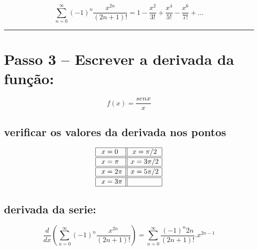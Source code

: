 \documentclass[11pt]{article}
\begin{document}
\begin{equation*}
\sum_{n=0}^\infty (-1)^n \frac{x^{2n}}{(2n+1)!} = 1 - \frac{x^2}{3!} + \frac{x^4}{5!} -\frac{x^6}{7!} + ...
\end{equation*}

    \begin{center}\rule{0.5\linewidth}{\linethickness}\end{center}

    \hypertarget{passo-3-escrever-a-derivada-da-funuxe7uxe3o}{%
\section{Passo 3 -- Escrever a derivada da
função:}\label{passo-3-escrever-a-derivada-da-funuxe7uxe3o}}

\begin{equation*}
f(x)   = \frac{senx}{x}
\end{equation*}

\hypertarget{verificar-os-valores-da-derivada-nos-pontos}{%
\subsection{verificar os valores da derivada nos
pontos}\label{verificar-os-valores-da-derivada-nos-pontos}}

\[\begin{array}{|l||c|}
\hline \
x = 0 & x = \pi/2\\
\hline
\hline \
x = \pi & x =3\pi/2\\
\hline
\hline \
x = 2\pi & x =5\pi/2\\
\hline
\hline \
x = 3\pi & \\
\hline
\end{array}\]

    \hypertarget{derivada-da-serie}{%
\subsection{derivada da serie:}\label{derivada-da-serie}}

\begin{equation*}
\frac{d}{dx}(\sum_{n=0}^\infty (-1)^n \frac{x^{2n}}{(2n+1)!}) = \sum_{n=0}^\infty \frac{(-1)^n 2n}{(2n+1)!}.x^{2n-1}
\end{equation*}
\end{document}
